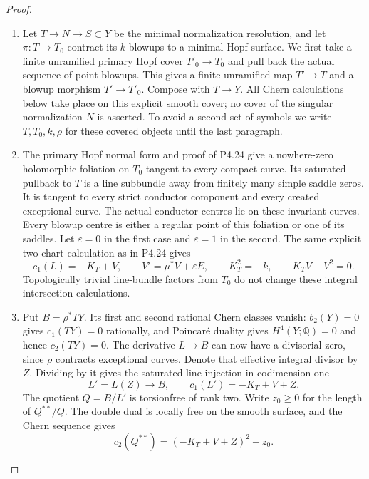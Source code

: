 \begin{proof}

\begin{enumerate}[label={$\langle1\rangle$\arabic*.},leftmargin=*]
\item Let $T\to N\to S\subset Y$ be the minimal normalization
resolution, and let $\pi:T\to T_0$ contract its $k$ blowups
to a minimal Hopf surface. We first take a finite unramified
primary Hopf cover $T'_0\to T_0$ and pull back the actual
sequence of point blowups. This gives a finite unramified
map $T'\to T$ and a blowup morphism $T'\to T'_0$.
Compose with $T\to Y$. All Chern calculations below take
place on this explicit smooth cover; no cover of the
singular normalization $N$ is asserted. To avoid a second
set of symbols we write $T,T_0,k,\rho$ for these covered
objects until the last paragraph.

\item The primary Hopf normal form and proof of P4.24 give a
nowhere-zero holomorphic foliation on $T_0$ tangent to
every compact curve. Its saturated pullback to $T$ is a
line subbundle away from finitely many simple saddle
zeros. It is tangent to every strict conductor component
and every created exceptional curve. The actual conductor
centres lie on these invariant curves. Every blowup centre
is either a regular point of this foliation or one of its
saddles. Let $\varepsilon=0$ in the first case and
$\varepsilon=1$ in the second. The same explicit two-chart
calculation as in P4.24 gives
\[
 c_1(L)=-K_T+V,\qquad
 V'=\mu^*V+\varepsilon E,
 \qquad K_T^2=-k,\qquad K_TV-V^2=0.
\]
Topologically trivial line-bundle factors from $T_0$ do
not change these integral intersection calculations.

\item Put $B=\rho^*TY$. Its first and second rational Chern
classes vanish: $b_2(Y)=0$ gives $c_1(TY)=0$ rationally,
and Poincar\'e duality gives $H^4(Y;\mathbb Q)=0$ and
hence $c_2(TY)=0$. The derivative $L\to B$ can now have
a divisorial zero, since $\rho$ contracts exceptional
curves. Denote that effective integral divisor by $Z$.
Dividing by it gives the saturated line injection in
codimension one
\[
 L'=L(Z)\longrightarrow B,
 \qquad c_1(L')=-K_T+V+Z.
\]
The quotient $Q=B/L'$ is torsionfree of rank two.
Write $z_0\ge0$ for the length of $Q^{**}/Q$.
The double dual is locally free on the smooth surface,
and the Chern sequence gives
\[
 c_2(Q^{**})=(-K_T+V+Z)^2-z_0.
\]


\end{enumerate}
\end{proof}
